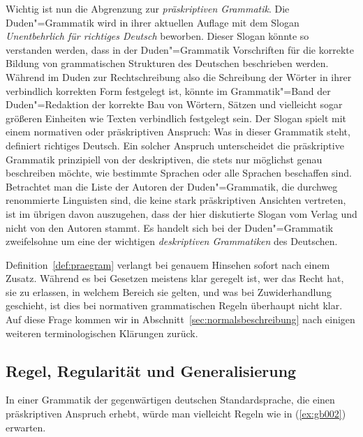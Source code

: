 Wichtig ist nun die Abgrenzung zur \textit{präskriptiven Grammatik}.
Die Duden"=Grammatik \citep{Duden8} wird in ihrer aktuellen Auflage mit dem Slogan \textit{Unentbehrlich für richtiges Deutsch} beworben.
Dieser Slogan könnte so verstanden werden, dass in der Duden"=Grammatik Vorschriften für die korrekte Bildung von grammatischen Strukturen des Deutschen beschrieben werden.
Während im Duden zur Rechtschreibung also die Schreibung der Wörter in ihrer verbindlich korrekten Form festgelegt ist, könnte im Grammatik"=Band der Duden"=Redaktion der korrekte Bau von Wörtern, Sätzen und vielleicht sogar größeren Einheiten wie Texten verbindlich festgelegt sein.
Der Slogan spielt mit einem normativen oder präskriptiven Anspruch:
Was in dieser Grammatik steht, definiert richtiges Deutsch.
Ein solcher Anspruch unterscheidet die präskriptive Grammatik prinzipiell von der deskriptiven, die stets nur möglichst genau beschreiben möchte, wie bestimmte Sprachen oder alle Sprachen beschaffen sind.
Betrachtet man die Liste der Autoren der Duden"=Grammatik, die durchweg renommierte Linguisten sind, die keine stark präskriptiven Ansichten vertreten, ist im übrigen davon auszugehen, dass der hier diskutierte Slogan vom Verlag und nicht von den Autoren stammt. 
Es handelt sich bei der Duden"=Grammatik zweifelsohne um eine der wichtigen \textit{deskriptiven Grammatiken} des Deutschen.


Definition~\ref{def:praegram} verlangt bei genauem Hinsehen sofort nach einem Zusatz.
Während es bei Gesetzen meistens klar geregelt ist, wer das Recht hat, sie zu erlassen, in welchem Bereich sie gelten, und was bei Zuwiderhandlung geschieht, ist dies bei normativen grammatischen Regeln überhaupt nicht klar.
Auf diese Frage kommen wir in Abschnitt~\ref{sec:normalsbeschreibung} nach einigen weiteren terminologischen Klärungen zurück.

\subsection{Regel, Regularität und Generalisierung}

\label{sec:regulgen}

In einer Grammatik der gegenwärtigen deutschen Standardsprache, die einen präskriptiven Anspruch erhebt, würde man vielleicht Regeln wie in (\ref{ex:gb002}) erwarten.


